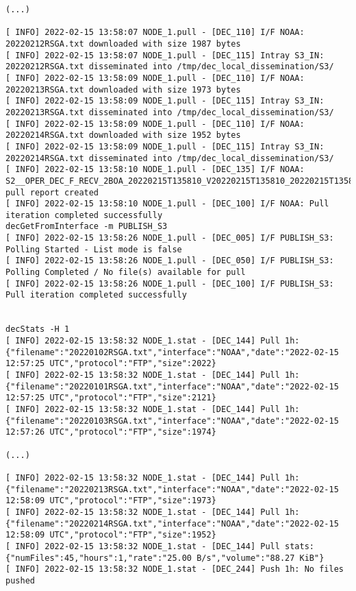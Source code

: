 \documentclass[dec_sum_main.tex]{subfiles}
\begin{document}
\begin{Verbatim}[fontsize=\tiny]
(...)

[ INFO] 2022-02-15 13:58:07 NODE_1.pull - [DEC_110] I/F NOAA: 20220212RSGA.txt downloaded with size 1987 bytes
[ INFO] 2022-02-15 13:58:07 NODE_1.pull - [DEC_115] Intray S3_IN: 20220212RSGA.txt disseminated into /tmp/dec_local_dissemination/S3/
[ INFO] 2022-02-15 13:58:09 NODE_1.pull - [DEC_110] I/F NOAA: 20220213RSGA.txt downloaded with size 1973 bytes
[ INFO] 2022-02-15 13:58:09 NODE_1.pull - [DEC_115] Intray S3_IN: 20220213RSGA.txt disseminated into /tmp/dec_local_dissemination/S3/
[ INFO] 2022-02-15 13:58:09 NODE_1.pull - [DEC_110] I/F NOAA: 20220214RSGA.txt downloaded with size 1952 bytes
[ INFO] 2022-02-15 13:58:09 NODE_1.pull - [DEC_115] Intray S3_IN: 20220214RSGA.txt disseminated into /tmp/dec_local_dissemination/S3/
[ INFO] 2022-02-15 13:58:10 NODE_1.pull - [DEC_135] I/F NOAA: S2__OPER_DEC_F_RECV_2BOA_20220215T135810_V20220215T135810_20220215T135810_NOAA.xml pull report created
[ INFO] 2022-02-15 13:58:10 NODE_1.pull - [DEC_100] I/F NOAA: Pull iteration completed successfully
decGetFromInterface -m PUBLISH_S3
[ INFO] 2022-02-15 13:58:26 NODE_1.pull - [DEC_005] I/F PUBLISH_S3: Polling Started - List mode is false
[ INFO] 2022-02-15 13:58:26 NODE_1.pull - [DEC_050] I/F PUBLISH_S3: Polling Completed / No file(s) available for pull
[ INFO] 2022-02-15 13:58:26 NODE_1.pull - [DEC_100] I/F PUBLISH_S3: Pull iteration completed successfully


decStats -H 1
[ INFO] 2022-02-15 13:58:32 NODE_1.stat - [DEC_144] Pull 1h: {"filename":"20220102RSGA.txt","interface":"NOAA","date":"2022-02-15 12:57:25 UTC","protocol":"FTP","size":2022}
[ INFO] 2022-02-15 13:58:32 NODE_1.stat - [DEC_144] Pull 1h: {"filename":"20220101RSGA.txt","interface":"NOAA","date":"2022-02-15 12:57:25 UTC","protocol":"FTP","size":2121}
[ INFO] 2022-02-15 13:58:32 NODE_1.stat - [DEC_144] Pull 1h: {"filename":"20220103RSGA.txt","interface":"NOAA","date":"2022-02-15 12:57:26 UTC","protocol":"FTP","size":1974}

(...)

[ INFO] 2022-02-15 13:58:32 NODE_1.stat - [DEC_144] Pull 1h: {"filename":"20220213RSGA.txt","interface":"NOAA","date":"2022-02-15 12:58:09 UTC","protocol":"FTP","size":1973}
[ INFO] 2022-02-15 13:58:32 NODE_1.stat - [DEC_144] Pull 1h: {"filename":"20220214RSGA.txt","interface":"NOAA","date":"2022-02-15 12:58:09 UTC","protocol":"FTP","size":1952}
[ INFO] 2022-02-15 13:58:32 NODE_1.stat - [DEC_144] Pull stats: {"numFiles":45,"hours":1,"rate":"25.00 B/s","volume":"88.27 KiB"}
[ INFO] 2022-02-15 13:58:32 NODE_1.stat - [DEC_244] Push 1h: No files pushed


\end{Verbatim}
\end{document}
